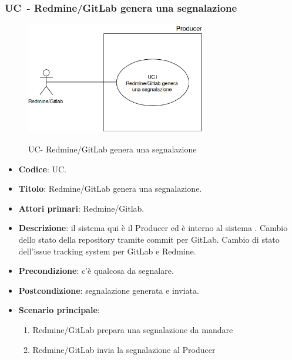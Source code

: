 \subsubsection{UC\theuccount\ - Redmine/GitLab genera una segnalazione}
    \begin{figure}[H]
		\centering
		\includegraphics[width=0.7\textwidth]{img/UC1.png}\\
		\caption{UC\theuccount - Redmine/GitLab genera una segnalazione}
	\end{figure}
	\begin{itemize}
		\item \textbf{Codice}: UC\theuccount.
		\item \textbf{Titolo}: Redmine/GitLab genera una segnalazione.
		\item \textbf{Attori primari}: Redmine/Gitlab.
		\item \textbf{Descrizione}:
		 il sistema qui è il Producer ed è interno al sistema \progetto. Cambio dello stato della repository tramite commit per GitLab. Cambio di stato dell'issue tracking system per GitLab e Redmine.
		\item \textbf{Precondizione}: c'è qualcosa da segnalare.
		\item \textbf{Postcondizione}: segnalazione generata e inviata.
		\item \textbf{Scenario principale}: 
		\begin{enumerate}
			\item Redmine/GitLab prepara una segnalazione da mandare
			\item Redmine/GitLab invia la segnalazione al Producer
		\end{enumerate}
		
	\end{itemize}

